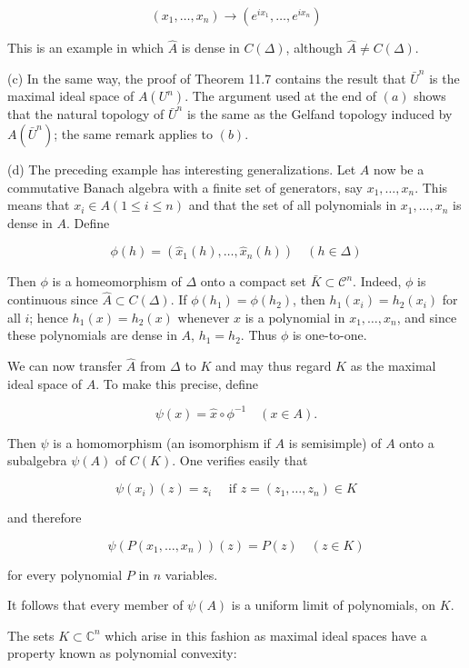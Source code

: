 \documentclass[10pt]{article}
\begin{document}
$$
\left(x_{1}, \ldots, x_{n}\right) \rightarrow\left(e^{i x_{1}}, \ldots, e^{i x_{n}}\right)
$$

This is an example in which $\hat{A}$ is dense in $C(\Delta)$, although $\hat{A} \neq C(\Delta)$.

(c) In the same way, the proof of Theorem 11.7 contains the result that $\bar{U}^{n}$ is the maximal ideal space of $A\left(U^{n}\right)$. The argument used at the end of $(a)$ shows that the natural topology of $\bar{U}^{n}$ is the same as the Gelfand topology induced by $A\left(\bar{U}^{n}\right)$; the same remark applies to $(b)$.

(d) The preceding example has interesting generalizations. Let $A$ now be a commutative Banach algebra with a finite set of generators, say $x_{1}, \ldots, x_{n}$. This means that $x_{i} \in A(1 \leq i \leq n)$ and that the set of all polynomials in $x_{1}, \ldots, x_{n}$ is dense in $A$. Define

$$
\phi(h)=\left(\hat{x}_{1}(h), \ldots, \hat{x}_{n}(h)\right) \quad(h \in \Delta)
$$

Then $\phi$ is a homeomorphism of $\Delta$ onto a compact set $\bar{K} \subset \mathscr{C}^{n}$. Indeed, $\phi$ is continuous since $\hat{A} \subset C(\Delta)$. If $\phi\left(h_{1}\right)=\phi\left(h_{2}\right)$, then $h_{1}\left(x_{i}\right)=h_{2}\left(x_{i}\right)$ for all $i$; hence $h_{1}(x)=h_{2}(x)$ whenever $x$ is a polynomial in $x_{1}, \ldots, x_{n}$, and since these polynomials are dense in $A$, $h_{1}=h_{2}$. Thus $\phi$ is one-to-one.

We can now transfer $\hat{A}$ from $\Delta$ to $K$ and may thus regard $K$ as the maximal ideal space of $A$. To make this precise, define

$$
\psi(x)=\hat{x} \circ \phi^{-1} \quad(x \in A) .
$$

Then $\psi$ is a homomorphism (an isomorphism if $A$ is semisimple) of $A$ onto a subalgebra $\psi(A)$ of $C(K)$. One verifies easily that

$$
\psi\left(x_{i}\right)(z)=z_{i} \quad \text { if } z=\left(z_{1}, \ldots, z_{n}\right) \in K
$$

and therefore

$$
\psi\left(P\left(x_{1}, \ldots, x_{n}\right)\right)(z)=P(z) \quad(z \in K)
$$

for every polynomial $P$ in $n$ variables.

It follows that every member of $\psi(A)$ is a uniform limit of polynomials, on $K$.

The sets $K \subset \mathbb{C}^{n}$ which arise in this fashion as maximal ideal spaces have a property known as polynomial convexity:
\end{document}
